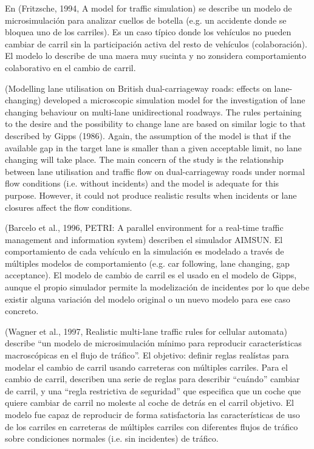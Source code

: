 En (Fritzsche, 1994, A model for traffic simulation) se describe un modelo de microsimulación para analizar cuellos de botella (e.g. un accidente donde se bloquea uno de los carriles). Es un caso típico donde los vehículos no pueden cambiar de carril sin la participación activa del resto de vehículos (colaboración). El modelo lo describe de una maera muy sucinta y no zonsidera comportamiento colaborativo en el cambio de carril.

(Modelling lane utilisation on British dual-carriageway roads: effects on lane-changing) developed a microscopic simulation model for the investigation of lane changing behaviour on multi-lane unidirectional roadways. The rules pertaining to the desire and the possibility to change lane are based on similar logic to that described by Gipps (1986). Again, the assumption of the model is that if the available gap in the target lane is smaller than a given acceptable limit, no lane changing will take place. The main concern of the study is the relationship between lane utilisation and traffic flow on dual-carriageway roads under normal flow conditions (i.e. without incidents) and the model is adequate for this purpose. However, it could not produce realistic results when incidents or lane closures affect the flow conditions.

(Barcelo et al., 1996, PETRI: A parallel environment for a real-time traffic management and information system) describen el simulador AIMSUN. El comportamiento de cada vehículo en la simulación es modelado a través de múltiples modelos de comportamiento (e.g. car following, lane changing, gap acceptance). El modelo de cambio de carril es el usado en el modelo de Gipps, aunque el propio simulador permite la modelización de incidentes por lo que debe existir alguna variación del modelo original o un nuevo modelo para ese caso concreto.

(Wagner et al., 1997, Realistic multi-lane traffic rules for cellular automata) describe \enquote{un modelo de microsimulación mínimo para reproducir características macroscópicas en el flujo de tráfico}. El objetivo: definir reglas realístas para modelar el cambio de carril usando carreteras con múltiples carriles. Para el cambio de carril, describen una serie de reglas para describir \enquote{cuándo} cambiar de carril, y una \enquote{regla restrictiva de seguridad} que especifica que un coche que quiere cambiar de carril no moleste al coche de detrás en el carril objetivo. El modelo fue capaz de reproducir de forma satisfactoria las características de uso de los carriles en carreteras de múltiples carriles con diferentes flujos de tráfico sobre condiciones normales (i.e. sin incidentes) de tráfico.

